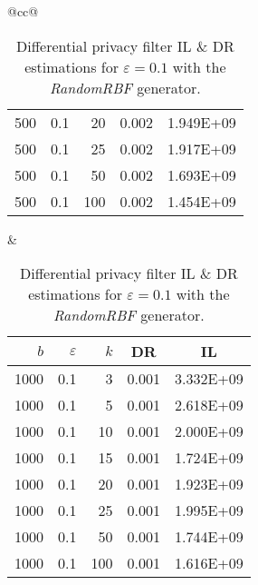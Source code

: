\begin{table}[H]
\begin{tabular}{@{}cc@{}}
\begin{tabular}{@{}rrrrr@{}}
			500 & 0.1 & 20  & 0.002 & 1.949E+09 \\
			500 & 0.1 & 25  & 0.002 & 1.917E+09 \\
			500 & 0.1 & 50  & 0.002 & 1.693E+09 \\
			500 & 0.1 & 100 & 0.002 & 1.454E+09 \\ \bottomrule
		\end{tabular}
		&
		\begin{tabular}{@{}rrrrr@{}}
			\toprule
			$b$ & $\varepsilon$ & $k$ & \multicolumn{1}{c}{DR} & \multicolumn{1}{c}{IL} \\ \midrule
			1000 & 0.1 & 3   & 0.001 & 3.332E+09 \\
			1000 & 0.1 & 5   & 0.001 & 2.618E+09 \\
			1000 & 0.1 & 10  & 0.001 & 2.000E+09 \\
			1000 & 0.1 & 15  & 0.001 & 1.724E+09 \\
			1000 & 0.1 & 20  & 0.001 & 1.923E+09 \\
			1000 & 0.1 & 25  & 0.001 & 1.995E+09 \\
			1000 & 0.1 & 50  & 0.001 & 1.744E+09 \\
			1000 & 0.1 & 100 & 0.001 & 1.616E+09 \\ \bottomrule
		\end{tabular}
	\end{tabular}
	\caption[Differential privacy filter DR \& IL estimations (RandomRBF), $\varepsilon = 0.1$.]{Differential privacy filter IL \& DR estimations for $\varepsilon = 0.1$ with the \textit{RandomRBF} generator.}
\end{table}

